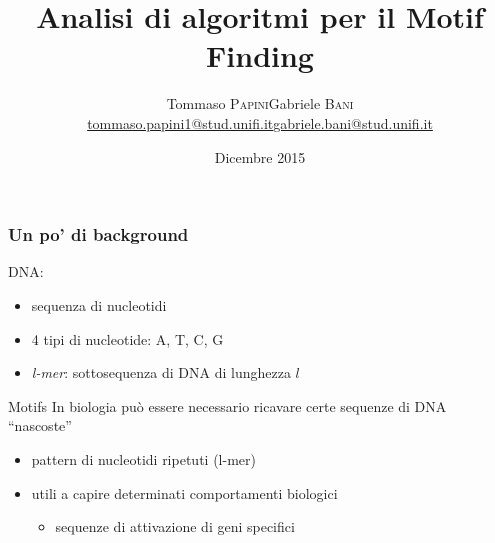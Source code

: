 



\title[Motif Finding]{Analisi di algoritmi per il Motif Finding}
\date[11 Dicembre 2015]{ Dicembre 2015}

\author[Papini - Bani]{
  \begin{center}
    \begin{tabular}{lr}
      Tommaso \textsc{Papini}&Gabriele \textsc{Bani}\\
      \href{mailto:tommaso.papini1@stud.unifi.it}{tommaso.papini1@stud.unifi.it}&
      \href{mailto:gabriele.bani@stud.unifi.it}{gabriele.bani@stud.unifi.it}
    \end{tabular}
  \end{center}
}


\begin{frame}[plain]
	\titlepage
\end{frame}

\begin{frame}
	\frametitle{Un po' di background}
	DNA:
	\begin{itemize}
		\item sequenza di nucleotidi
		\item 4 tipi di nucleotide: A, T, C, G
		\item \textit{l-mer}: sottosequenza di DNA di lunghezza $l$
	\end{itemize}
	\begin{block}{Motifs}
		In biologia può essere necessario ricavare certe sequenze di DNA ``nascoste''
		\begin{itemize}
			\item pattern di nucleotidi ripetuti (l-mer)
			\item utili a capire determinati comportamenti biologici
			\begin{itemize}
				\item sequenze di attivazione di geni specifici
			\end{itemize}
		\end{itemize}
	\end{block}
\end{frame}

